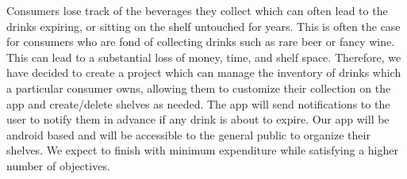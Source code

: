 Consumers lose track of the beverages they collect which can often lead to the drinks expiring, or sitting on the shelf
untouched for years. This is often the case for consumers who are fond of collecting drinks such as rare beer or 
fancy wine. This can lead to a substantial loss of money, time, and shelf space. Therefore, we have decided to create a 
project which can manage the inventory of drinks which a particular consumer owns, allowing them to customize their collection
on the app and create/delete shelves as needed. The app will send notifications to the user to notify them in advance if any
 drink is about to expire. Our app will be android based and will be accessible to the general public to organize their shelves.
We expect to finish with minimum expenditure while satisfying a higher number of objectives.
